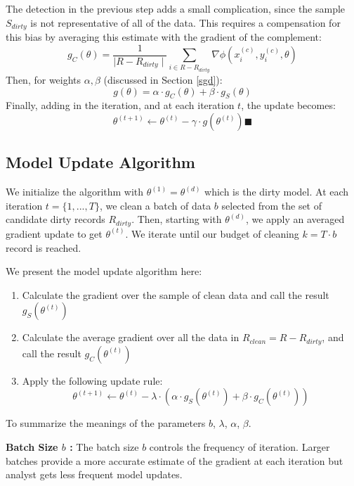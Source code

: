 The detection in the previous step adds a small complication, since the sample $S_{dirty}$ is not representative of all of the data.
This requires a compensation for this bias by averaging this estimate with the gradient of the complement:
\[
g_C(\theta) = \frac{1}{\mid R - R_{dirty}\mid}\sum_{i \in R - R_{dirty}}\nabla\phi(x_i^{(c)},y_i^{(c)},\theta)
\]
Then, for weights $\alpha,\beta$ (discussed in Section \ref{sgd}):
\[
g(\theta) = \alpha \cdot g_C(\theta) + \beta \cdot g_S(\theta)
\]
Finally, adding in the iteration, and at each iteration $t$, the update becomes:
\[
\theta^{(t+1)} \leftarrow \theta^{(t)} - \gamma \cdot g(\theta^{(t)}) \blacksquare
\]

\subsection{Model Update Algorithm}
We initialize the algorithm with $\theta^{(1)} = \theta^{(d)}$ which is the dirty model.
At each iteration $t=\{1,...,T\}$, we clean a batch of data $b$ selected from the set of candidate dirty records $R_{dirty}$.
Then, starting with $\theta^{(d)}$, we apply an averaged gradient update to get $\theta^{(t)}$.
We iterate until our budget of cleaning $k = T \cdot b$ record is reached.

We present the model update algorithm here:
\begin{enumerate}[noitemsep]
	\item Calculate the gradient over the sample of clean data and call the result $g_S(\theta^{(t)})$
	\item Calculate the average gradient over all the data in $R_{clean}=R-R_{dirty}$, and call the result $g_C(\theta^{(t)})$
	\item Apply the following update rule:
	\[
	\theta^{(t+1)} \leftarrow \theta^{(t)} - \lambda \cdot(\alpha\cdot g_S(\theta^{(t)}) + \beta \cdot  g_C(\theta^{(t)}))
	\]
\end{enumerate} 

\noindent To summarize the meanings of the parameters $b$, $\lambda$, $\alpha$, $\beta$.

\vspace{0.25em}

\noindent\textbf{Batch Size $b$ : } The batch size $b$ controls the frequency of iteration. Larger batches provide a more accurate estimate of the gradient at each iteration but analyst gets less frequent model updates. 

\vspace{0.25em}

